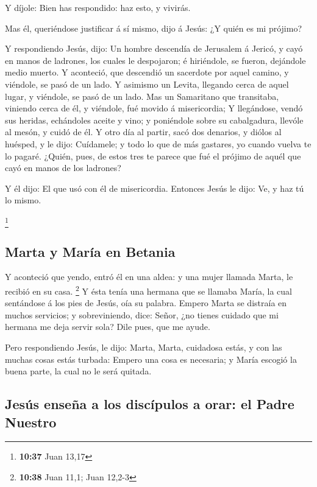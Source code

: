  Y díjole: Bien has respondido: haz esto, y vivirás.

 Mas él, queriéndose justificar á sí mismo, dijo á Jesús:
¿Y quién es mi prójimo?

 Y respondiendo Jesús, dijo: Un hombre descendía de
Jerusalem á Jericó, y cayó en manos de ladrones, los cuales le
despojaron; é hiriéndole, se fueron, dejándole medio muerto.
 Y aconteció, que descendió un sacerdote por aquel camino,
y viéndole, se pasó de un lado.  Y asimismo un Levita,
llegando cerca de aquel lugar, y viéndole, se pasó de un lado.
 Mas un Samaritano que transitaba, viniendo cerca de él, y
viéndole, fué movido á misericordia;  Y llegándose, vendó
sus heridas, echándoles aceite y vino; y poniéndole sobre su
cabalgadura, llevóle al mesón, y cuidó de él.  Y otro día
al partir, sacó dos denarios, y diólos al huésped, y le dijo: Cuídamele;
y todo lo que de más gastares, yo cuando vuelva te lo pagaré.
 ¿Quién, pues, de estos tres te parece que fué el prójimo
de aquél que cayó en manos de los ladrones?

 Y él dijo: El que usó con él de misericordia. Entonces
Jesús le dijo: Ve, y haz tú lo mismo.

\footnote{\textbf{10:37} Juan 13,17}

\hypertarget{marta-y-maruxeda-en-betania}{%
\subsection{Marta y María en
Betania}\label{marta-y-maruxeda-en-betania}}

 Y aconteció que yendo, entró él en una aldea: y una mujer
llamada Marta, le recibió en su casa. \footnote{\textbf{10:38} Juan
  11,1; Juan 12,2-3}  Y ésta tenía una hermana que se
llamaba María, la cual sentándose á los pies de Jesús, oía su palabra.
 Empero Marta se distraía en muchos servicios; y
sobreviniendo, dice: Señor, ¿no tienes cuidado que mi hermana me deja
servir sola? Dile pues, que me ayude.

 Pero respondiendo Jesús, le dijo: Marta, Marta, cuidadosa
estás, y con las muchas cosas estás turbada:  Empero una
cosa es necesaria; y María escogió la buena parte, la cual no le será
quitada.

\hypertarget{jesuxfas-enseuxf1a-a-los-discuxedpulos-a-orar-el-padre-nuestro}{%
\subsection{Jesús enseña a los discípulos a orar: el Padre
Nuestro}\label{jesuxfas-enseuxf1a-a-los-discuxedpulos-a-orar-el-padre-nuestro}}


